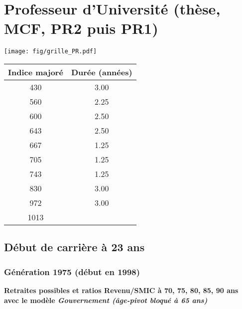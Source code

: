 \newpage 
 
\chapter{Professeur d'Université (thèse, MCF, PR2 puis PR1)} 

\begin{minipage}{0.55\linewidth}\texttt{[image: fig/grille\_PR.pdf]}\end{minipage} 
\begin{minipage}{0.3\linewidth} 
 \begin{center} 

\begin{tabular}[htb]{|c|c|} 
\hline 
 Indice majoré &  Durée (années) \\ 
\hline \hline 
 430 &  3.00 \\ 
\hline 
 560 &  2.25 \\ 
\hline 
 600 &  2.50 \\ 
\hline 
 643 &  2.50 \\ 
\hline 
 667 &  1.25 \\ 
\hline 
 705 &  1.25 \\ 
\hline 
 743 &  1.25 \\ 
\hline 
 830 &  3.00 \\ 
\hline 
 972 &  3.00 \\ 
\hline 
 1013 &   \\ 
\hline 
\hline 
\end{tabular} 
\end{center} 
 \end{minipage} 


 \addto{\captionsenglish}{ \renewcommand{\mtctitle}{}} \setcounter{minitocdepth}{2} 
 \minitoc \newpage 

\section{Début de carrière à 23 ans} 

\subsection{Génération 1975 (début en 1998)} 

{\bf \noindent Retraites possibles et ratios Revenu/SMIC à 70, 75, 80, 85, 90 ans avec le modèle \emph{Gouvernement (âge-pivot bloqué à 65 ans)}}  
 
